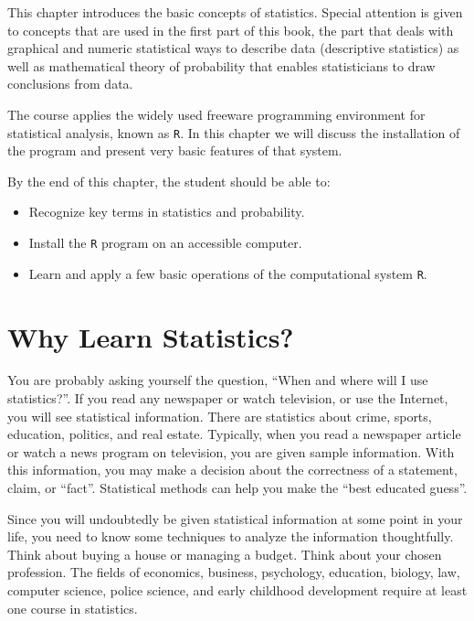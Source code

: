 \documentclass[
]{krantz}
\providecommand{\tightlist}{%
  \setlength{\itemsep}{0pt}\setlength{\parskip}{0pt}}
\theoremstyle{definition}
\theoremstyle{definition}
\theoremstyle{definition}
\theoremstyle{remark}
\begin{document}
This chapter introduces the basic concepts of statistics. Special attention is given to concepts that are used in the first part of this book, the part that deals with graphical and numeric statistical ways to describe data (descriptive statistics) as well as mathematical theory of probability that enables statisticians to draw conclusions from data.

The course applies the widely used freeware programming environment for statistical analysis, known as \texttt{R}. In this chapter we will discuss the installation of the program and present very basic features of that system.

By the end of this chapter, the student should be able to:

\begin{itemize}
\tightlist
\item
  Recognize key terms in statistics and probability.
\item
  Install the \texttt{R} program on an accessible computer.
\item
  Learn and apply a few basic operations of the computational system \texttt{R}.
\end{itemize}

\hypertarget{why-learn-statistics}{%
\section{Why Learn Statistics?}\label{why-learn-statistics}}

You are probably asking yourself the question, ``When and where will I use statistics?''. If you read any newspaper or watch television, or use the Internet, you will see statistical information. There are statistics about crime, sports, education, politics, and real estate. Typically, when you read a newspaper article or watch a news program on television, you are given sample information. With this information, you may make a decision about the correctness of a statement, claim, or ``fact''. Statistical methods can help you make the ``best educated guess''.

Since you will undoubtedly be given statistical information at some point in your life, you need to know some techniques to analyze the information thoughtfully. Think about buying a house or managing a budget. Think about your chosen profession. The fields of economics, business, psychology, education, biology, law, computer science, police science, and early childhood development require at least one course in statistics.
\end{document}
